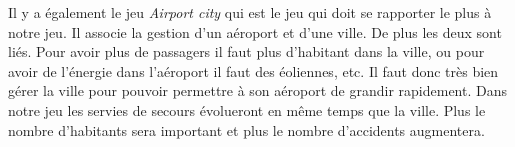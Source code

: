 Il y a également le jeu \textit{Airport city\footnotemark[4]} qui est le jeu qui doit se rapporter le plus à notre jeu. Il associe la gestion d'un aéroport et d'une ville. De plus les deux sont liés. Pour avoir plus de passagers il faut plus d'habitant dans la ville, ou pour avoir de l'énergie dans l'aéroport il faut des éoliennes, etc. Il faut donc très bien gérer la ville pour pouvoir permettre à son aéroport de grandir rapidement. Dans notre jeu les servies de secours évolueront en même temps que la ville. Plus le nombre d'habitants sera important et plus le nombre d'accidents augmentera.


